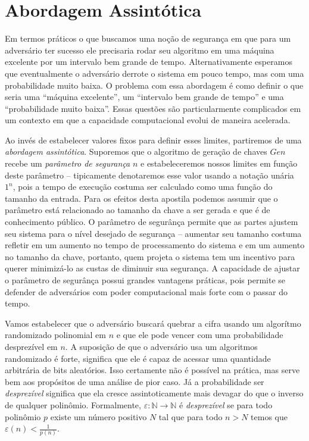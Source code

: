 \section{Abordagem Assintótica}
\label{sec:abord-assint}

Em termos práticos o que buscamos uma noção de segurança em que para um adversário ter sucesso ele precisaria rodar seu algoritmo em uma máquina excelente por um intervalo bem grande de tempo.
Alternativamente esperamos que eventualmente o adversário derrote o sistema em pouco tempo, mas com uma probabilidade muito baixa.
O problema com essa abordagem é como definir o que seria uma ``máquina excelente'', um ``intervalo bem grande de tempo'' e uma ``probabilidade muito baixa''.
Essas questões são particularmente complicados em um contexto em que a capacidade computacional evolui de maneira acelerada.

Ao invés de estabelecer valores fixos para definir esses limites, partiremos de uma {\em abordagem assintótica}.
Suporemos que o algoritmo de geração de chaves $Gen$ recebe um {\em parâmetro de segurança} $n$ e estabeleceremos nossos limites em função deste parâmetro -- tipicamente denotaremos esse valor usando a notação unária $1^n$, pois a tempo de execução costuma ser calculado como uma função do tamanho da entrada.
Para os efeitos desta apostila podemos assumir que o parâmetro está relacionado ao tamanho da chave a ser gerada e que é de conhecimento público.
O parâmetro de segurânça permite que as partes ajustem seu sistema para o nível desejado de segurança -- aumentar seu tamanho costuma refletir em um aumento no tempo de processamento do sistema e em um aumento no tamanho da chave, portanto, quem projeta o sistema tem um incentivo para querer minimizá-lo as custas de diminuir sua segurança.
A capacidade de ajustar o parâmetro de segurânça possui grandes vantagens práticas, pois permite se defender de adversários com poder computacional mais forte com o passar do tempo.

Vamos estabelecer que o adversário buscará quebrar a cifra usando um algorítmo randomizado polinomial em $n$ e que ele pode vencer com uma probabilidade desprezível em $n$.
A suposição de que o adversário usa um algoritmos randomizado é forte, significa que ele é capaz de acessar uma quantidade arbitrária de bits aleatórios.
Isso certamente não é possível na prática, mas serve bem aos propósitos de uma análise de pior caso.
Já a probabilidade ser {\em desprezível} significa que ela cresce assintoticamente mais devagar do que o inverso de qualquer polinômio.
Formalmente, $\varepsilon: \mathbb{N} \to \mathbb{N}$ é {\em desprezível} se para todo polinômio $p$ existe um número positivo $N$ tal que para todo $n > N$ temos que $\varepsilon(n) < \frac{1}{p(n)}$.


